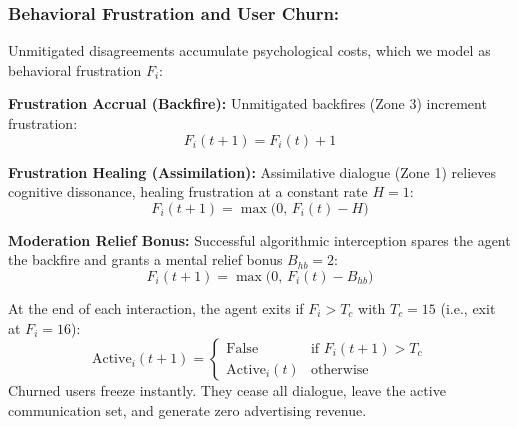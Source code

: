 \subsubsection{Behavioral Frustration and User Churn:}
Unmitigated disagreements accumulate psychological costs, which we model as behavioral frustration $F_i$:
\begin{itemize*}
    \item \textbf{Frustration Accrual (Backfire):} Unmitigated backfires (Zone 3) increment frustration:
    \begin{equation}
        F_i(t+1) = F_i(t) + 1
    \end{equation}
    \item \textbf{Frustration Healing (Assimilation):} Assimilative dialogue (Zone 1) relieves cognitive dissonance, healing frustration at a constant rate $H = 1$:
    \begin{equation}
        F_i(t+1) = \max\Big(0,\, F_i(t) - H\Big)
    \end{equation}
    \item \textbf{Moderation Relief Bonus:} Successful algorithmic interception spares the agent the backfire and grants a mental relief bonus $B_{hb} = 2$:
    \begin{equation}
        F_i(t+1) = \max\Big(0,\, F_i(t) - B_{hb}\Big)
    \end{equation}
\end{itemize*}

At the end of each interaction, the agent exits if $F_i > T_c$ with $T_c = 15$ (i.e., exit at $F_i=16$):
\begin{equation}
    \text{Active}_i(t+1) = \begin{cases}
        \text{False} & \text{if } F_i(t+1) > T_c \\
        \text{Active}_i(t) & \text{otherwise}
    \end{cases}
\end{equation}
Churned users freeze instantly. They cease all dialogue, leave the active communication set, and generate zero advertising revenue.

